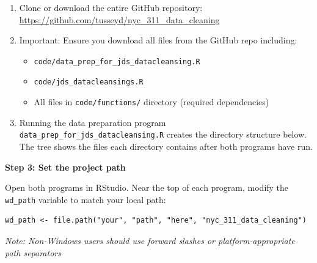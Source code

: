 \documentclass[linenumber]{jdsart}
\begin{document}
\begin{enumerate}
\item Clone or download the entire GitHub repository: \\
\url{https://github.com/tusseyd/nyc_311_data_cleaning}
\item Important: Ensure you download all files from the GitHub repo including:


\begin{itemize}
\item \texttt{code/data\_prep\_for\_jds\_datacleansing.R}
\item \texttt{code/jds\_datacleansings.R}
\item All files in \texttt{code/functions/} directory (required dependencies)
\end{itemize}


\item Running the data preparation program \texttt{data\_prep\_for\_jds\_datacleansing.R} 
creates the directory structure below. The tree shows the files each
directory contains after both programs have run.

\medskip
\noindent\begin{minipage}{\linewidth}
\end{minipage}
\end{enumerate}

\medskip\noindent\textbf{Step 3: Set the project path}

\noindent Open both programs in RStudio. Near the top of each program, modify
the \texttt{wd\_path} variable to match your local path:


\begin{verbatim}
wd_path <- file.path("your", "path", "here", "nyc_311_data_cleaning")
\end{verbatim}
\textit{Note: Non-Windows users should use forward slashes or 
platform-appropriate path separators}
\end{document}
